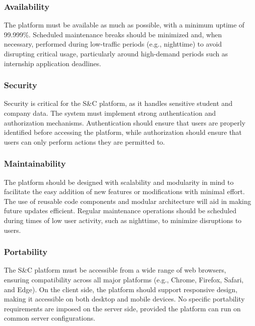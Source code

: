 \subsubsection{Availability}
The platform must be available as much as possible, with a minimum uptime of 99.999\%. Scheduled maintenance breaks should be minimized and, when necessary, performed during low-traffic periods (e.g., nighttime) to avoid disrupting critical usage, particularly around high-demand periods such as internship application deadlines.

\subsubsection{Security}
Security is critical for the S\&C platform, as it handles sensitive student and company data. The system must implement strong authentication and authorization mechanisms. Authentication should ensure that users are properly identified before accessing the platform, while authorization should ensure that users can only perform actions they are permitted to.

\subsubsection{Maintainability}
The platform should be designed with scalability and modularity in mind to facilitate the easy addition of new features or modifications with minimal effort. The use of reusable code components and modular architecture will aid in making future updates efficient. Regular maintenance operations should be scheduled during times of low user activity, such as nighttime, to minimize disruptions to users.

\subsubsection{Portability}
The S\&C platform must be accessible from a wide range of web browsers, ensuring compatibility across all major platforms (e.g., Chrome, Firefox, Safari, and Edge). On the client side, the platform should support responsive design, making it accessible on both desktop and mobile devices. No specific portability requirements are imposed on the server side, provided the platform can run on common server configurations.


\newpage
